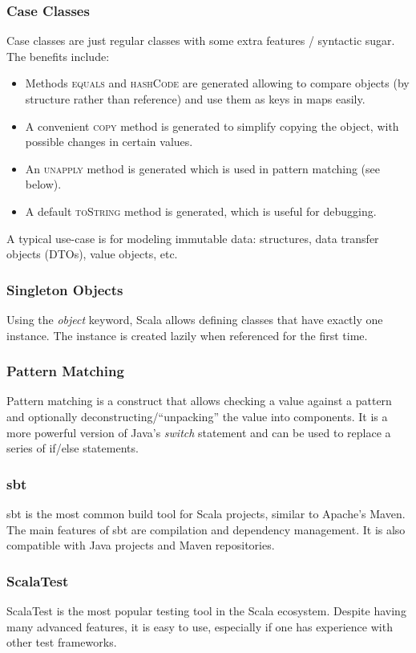\subsubsection{Case Classes}
Case classes are just regular classes with some extra features / syntactic sugar.
The benefits include:
\begin{itemize}
  \item Methods \textsc{equals} and \textsc{hashCode} are generated allowing to compare objects (by structure rather than reference) and use them as keys in maps easily.
  \item A convenient \textsc{copy} method is generated to simplify copying the object, with possible changes in certain values.
  \item An \textsc{unapply} method is generated which is used in pattern matching (see below).
  \item A default \textsc{toString} method is generated, which is useful for debugging.
\end{itemize}

A typical use-case is for modeling immutable data: structures, data transfer objects (DTOs), value objects, etc.


\subsubsection{Singleton Objects}
Using the \textit{object} keyword, Scala allows defining classes that have exactly one instance.
The instance is created lazily when referenced for the first time.

\subsubsection{Pattern Matching}
Pattern matching is a construct that allows checking a value against a pattern and optionally deconstructing/\enquote{unpacking} the value into components.
It is a more powerful version of Java's \textit{switch} statement and can be used to replace a series of if/else statements.

\subsubsection{sbt}
sbt is the most common build tool for Scala projects, similar to Apache's Maven.
The main features of sbt are compilation and dependency management.
It is also compatible with Java projects and Maven repositories.

\subsubsection{ScalaTest}
ScalaTest is the most popular testing tool in the Scala ecosystem.
Despite having many advanced features, it is easy to use, especially if one has experience with other test frameworks.

